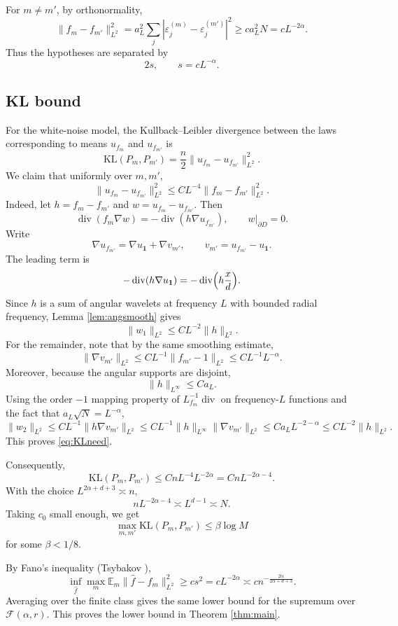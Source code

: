 \documentclass[11pt]{article}
\newcommand{\E}{\mathbb{E}}
\newcommand{\1}{\mathbf{1}}
\DeclareMathOperator{\diver}{div}
\begin{document}
For $m\neq m'$, by orthonormality,
\[
\|f_m-f_{m'}\|_{L^2}^2
=
a_L^2\sum_j|\varepsilon_j^{(m)}-\varepsilon_j^{(m')}|^2
\ge
c a_L^2N
=
c L^{-2\alpha}.
\]
Thus the hypotheses are separated by
\[
2s,\qquad s=c L^{-\alpha}.
\]

\subsection{KL bound}

For the white-noise model, the Kullback--Leibler divergence between the laws corresponding to means $u_{f_m}$ and $u_{f_{m'}}$ is
\[
\mathrm{KL}(P_m,P_{m'})
=
\frac n2\|u_{f_m}-u_{f_{m'}}\|_{L^2}^2.
\]
We claim that uniformly over $m,m'$,
\begin{equation}\label{eq:KLneed}
\|u_{f_m}-u_{f_{m'}}\|_{L^2}^2
\le
C L^{-4}\|f_m-f_{m'}\|_{L^2}^2.
\end{equation}
Indeed, let $h=f_m-f_{m'}$ and $w=u_{f_m}-u_{f_{m'}}$. Then
\[
\diver(f_m\nabla w)
=
-\diver(h\nabla u_{f_{m'}}),
\qquad w|_{\partial D}=0.
\]
Write
\[
\nabla u_{f_{m'}}=\nabla u_{\1}+\nabla v_{m'},
\qquad
v_{m'}=u_{f_{m'}}-u_{\1}.
\]
The leading term is
\[
-\diver(h\nabla u_{\1})
=
-\diver\Bigl(h\frac{x}{d}\Bigr).
\]
Since $h$ is a sum of angular wavelets at frequency $L$ with bounded radial frequency, Lemma \ref{lem:angsmooth} gives
\[
\|w_1\|_{L^2}
\le C L^{-2}\|h\|_{L^2}.
\]
For the remainder, note that by the same smoothing estimate,
\[
\|\nabla v_{m'}\|_{L^2}
\le C L^{-1}\|f_{m'}-1\|_{L^2}
\le C L^{-1}L^{-\alpha}.
\]
Moreover, because the angular supports are disjoint,
\[
\|h\|_{L^\infty}\le C a_L.
\]
Using the order $-1$ mapping property of $L_{f_m}^{-1}\diver$ on frequency-$L$ functions and the fact that $a_L\sqrt N=L^{-\alpha}$,
\[
\|w_2\|_{L^2}
\le
C L^{-1}\|h\nabla v_{m'}\|_{L^2}
\le
C L^{-1}\|h\|_{L^\infty}\|\nabla v_{m'}\|_{L^2}
\le
C a_L L^{-2-\alpha}
\le
C L^{-2}\|h\|_{L^2}.
\]
This proves \eqref{eq:KLneed}.

Consequently,
\[
\mathrm{KL}(P_m,P_{m'})
\le
C n L^{-4}L^{-2\alpha}
=
C n L^{-2\alpha-4}.
\]
With the choice $L^{2\alpha+d+3}\asymp n$,
\[
n L^{-2\alpha-4}
\asymp
L^{d-1}
\asymp
N.
\]
Taking $c_0$ small enough, we get
\[
\max_{m,m'}\mathrm{KL}(P_m,P_{m'})
\le \beta\log M
\]
for some $\beta<1/8$.

By Fano's inequality (Tsybakov \cite[Theorem 2.15]{Tsybakov}),
\[
\inf_{\widehat f}\max_{m}\E_m\|\widehat f-f_m\|_{L^2}^2
\ge
c s^2
=
c L^{-2\alpha}
\asymp
c n^{-\frac{2\alpha}{2\alpha+d+3}}.
\]
Averaging over the finite class gives the same lower bound for the supremum over $\mathcal F(\alpha,r)$. This proves the lower bound in Theorem \ref{thm:main}.
\end{document}
